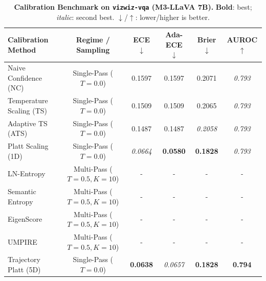 \begin{table}[t]
\setlength{\tabcolsep}{4pt}
\renewcommand{\arraystretch}{1.05}
\centering
\footnotesize
\begin{tabular}{lccccc}
\toprule
\textbf{Calibration Method} & \textbf{Regime / Sampling} & \textbf{ECE} $\downarrow$ & \textbf{Ada-ECE} $\downarrow$ & \textbf{Brier} $\downarrow$ & \textbf{AUROC} $\uparrow$ \\
\midrule
Naive Confidence (NC) & Single-Pass ($T = 0.0$) & 0.1597 & 0.1597 & 0.2071 & \textit{0.793} \\
Temperature Scaling (TS) & Single-Pass ($T = 0.0$) & 0.1509 & 0.1509 & 0.2065 & \textit{0.793} \\
Adaptive TS (ATS) & Single-Pass ($T = 0.0$) & 0.1487 & 0.1487 & \textit{0.2058} & \textit{0.793} \\
Platt Scaling (1D) & Single-Pass ($T = 0.0$) & \textit{0.0664} & \textbf{0.0580} & \textbf{0.1828} & \textit{0.793} \\
LN-Entropy & Multi-Pass ($T = 0.5, K = 10$) & - & - & - & - \\
Semantic Entropy & Multi-Pass ($T = 0.5, K = 10$) & - & - & - & - \\
EigenScore & Multi-Pass ($T = 0.5, K = 10$) & - & - & - & - \\
UMPIRE & Multi-Pass ($T = 0.5, K = 10$) & - & - & - & - \\
Trajectory Platt (5D) & Single-Pass ($T = 0.0$) & \textbf{0.0638} & \textit{0.0657} & \textbf{0.1828} & \textbf{0.794} \\
\bottomrule
\end{tabular}
\caption{\textbf{Calibration Benchmark on \texttt{vizwiz-vqa} (M3-LLaVA 7B).} \textbf{Bold}: best; \textit{italic}: second best. $\downarrow$/$\uparrow$: lower/higher is better.}
\label{tab:benchmark_m3_vizwizvqa}
\end{table}

